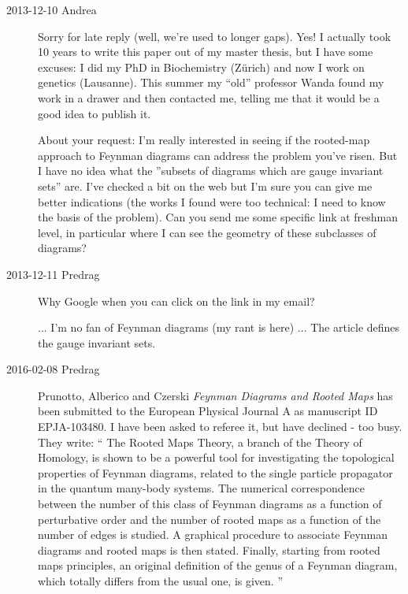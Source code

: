 \begin{description}
\item[2013-12-10   {Andrea}]
Sorry for late reply (well, we're used to longer gaps). Yes! I actually
took 10 years to write this paper out of my master thesis, but I have
some excuses: I did my PhD in Biochemistry (Z\"urich) and now I work on
genetics (Lausanne). This summer my ``old'' professor Wanda found my work
in a drawer and then contacted me, telling me that it would be a good
idea to publish it.

About your request: I'm really interested in seeing if the rooted-map
approach to Feynman diagrams can address the problem you've risen. But I
have no idea what the ''subsets of diagrams which are gauge invariant
sets'' are. I've checked a bit on the web but I'm sure you can give me
better indications (the works I found were too technical: I need to know
the basis of the problem). Can you send me some specific link at freshman
level, in particular where I can see the geometry of these subclasses of
diagrams?

\item[2013-12-11  Predrag]
Why Google when you can click on the link in my email?

    ... I'm no fan of Feynman diagrams (my rant is
{here}) ... The article defines the gauge invariant sets.

\item[2016-02-08  Predrag]
Prunotto, Alberico and Czerski
{\em Feynman Diagrams and Rooted Maps}
has been submitted to the European Physical Journal A as manuscript ID EPJA-103480.
I have been asked to referee it, but have declined - too busy. They write: ``
The  Rooted Maps Theory, a branch of the Theory of Homology, is shown to be
a powerful tool for investigating  the topological properties of Feynman
diagrams, related to the single particle propagator in the quantum many-body
systems. The numerical correspondence between the number of this class of
Feynman diagrams as a function of perturbative order and the number of rooted
maps as a function of the number of edges is studied. A graphical procedure to
associate Feynman diagrams and rooted maps is then stated. Finally, starting
from rooted maps principles, an original definition of the genus of a
Feynman diagram, which totally differs from the usual one, is given.
''


\end{description}
